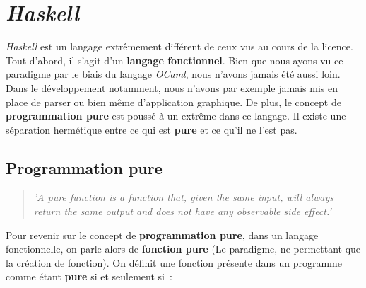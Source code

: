 \section{\textit{Haskell}}

\textit{Haskell} est un langage extrêmement différent de ceux vus au cours de 
la licence. Tout d'abord, il s'agit d'un \textbf{langage fonctionnel}. Bien que 
nous ayons vu ce paradigme par le biais du langage \textit{OCaml}, 
nous n'avons jamais été aussi loin. Dans le développement notamment, nous 
n'avons par exemple jamais mis en place de parser ou bien même d'application 
graphique. De plus, le concept de \textbf{programmation pure} est poussé à un 
extrême dans ce langage. Il existe une séparation hermétique entre ce qui est 
\textbf{pure} et ce qu'il ne l'est pas.

\subsection{Programmation pure}

\begin{quotation}
    \textit{'A pure function is a function that, given the same input, will 
    always return the same output and does not have any observable side effect.'
    }\cite{citationPureProg}
\end{quotation}

Pour revenir sur le concept de \textbf{programmation pure}, dans un langage 
fonctionnelle, on parle alors de \textbf{fonction pure} (Le paradigme, ne 
permettant que la création de fonction). On définit une fonction présente dans 
un programme comme étant \textbf{pure} si et seulement si~:

